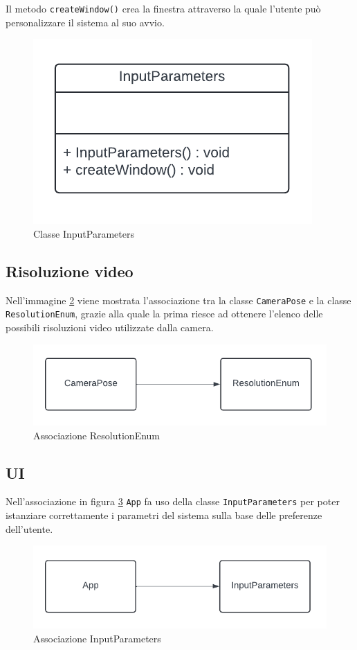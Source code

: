 \documentclass[12pt,a4paper,openright,twoside]{book}
\begin{document}
Il metodo \texttt{createWindow()} crea la finestra attraverso la quale l'utente può personalizzare il sistema al suo avvio.	
\begin{figure}[h!]
	\centering
	\includegraphics[width=0.5\linewidth]{./figures/UML/inputParameters.pdf}
	\caption{Classe InputParameters}
	\label{fig:input_parameters}
\end{figure}
\subsection{Risoluzione video}
Nell'immagine \ref{fig:camera_pose_block} viene mostrata l'associazione tra la classe \texttt{CameraPose} e la classe \texttt{ResolutionEnum}, grazie alla quale la prima riesce ad ottenere l'elenco delle possibili risoluzioni video utilizzate dalla camera.
\begin{figure}[h!]
	\centering
	\includegraphics[width=0.5\linewidth]{./figures/UML/cameraPoseBlock.pdf}
	\caption{Associazione ResolutionEnum}
	\label{fig:camera_pose_block}
\end{figure}
\subsection{UI}
Nell'associazione in figura \ref{fig:UI} \texttt{App} fa uso della classe \texttt{InputParameters} per poter istanziare correttamente i parametri del sistema sulla base delle preferenze dell'utente.
\begin{figure}[h!]
	\centering
	\includegraphics[width=0.5\linewidth]{./figures/UML/UI.pdf}
	\caption{Associazione InputParameters}
	\label{fig:UI}
\end{figure}
\end{document}
